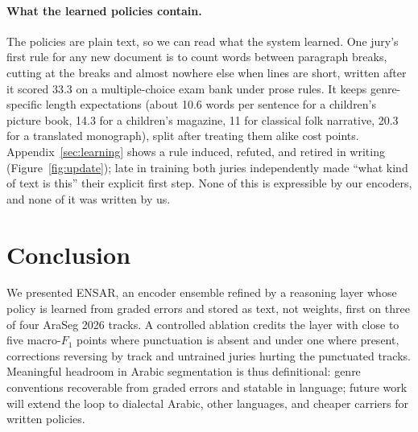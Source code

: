 \documentclass[11pt]{article}
\begin{document}
\paragraph{What the learned policies contain.}
\label{sec:inside}
The policies are plain text, so we can read what the system learned. One jury's first
rule for any new document is to count words between paragraph breaks, cutting at the
breaks and almost nowhere else when lines are short, written after it scored 33.3 on a
multiple-choice exam bank under prose rules. It keeps genre-specific length
expectations (about 10.6 words per sentence for a children's picture book, 14.3 for a
children's magazine, 11 for classical folk narrative, 20.3 for a translated
monograph), split after treating them alike cost points.
Appendix~\ref{sec:learning} shows a rule induced, refuted, and retired in writing
(Figure~\ref{fig:update}); late in training both juries independently made ``what
kind of text is this'' their explicit first step. None of this is expressible by our encoders, and none of it was written by us.
\section{Conclusion}
We presented ENSAR, an encoder ensemble refined by a reasoning layer whose policy is
learned from graded errors and stored as text, not weights, first on three of four AraSeg
2026 tracks. A controlled ablation credits the layer with close to
five macro-$F_1$ points where punctuation is absent and under one where present,
corrections reversing by track and untrained juries hurting the punctuated tracks. Meaningful headroom in Arabic segmentation is thus definitional: genre
conventions recoverable from graded errors and statable in language; future work will
extend the loop to dialectal Arabic, other languages, and cheaper carriers for written
policies.
\end{document}

